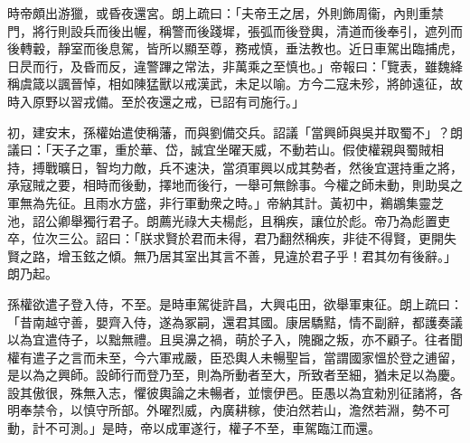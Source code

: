 \begin{pinyinscope}
時帝頗出游獵，或昏夜還宮。朗上疏曰：「夫帝王之居，外則飾周衞，內則重禁門，將行則設兵而後出幄，稱警而後踐墀，張弧而後登輿，清道而後奉引，遮列而後轉轂，靜室而後息駕，皆所以顯至尊，務戒慎，垂法教也。近日車駕出臨捕虎，日昃而行，及昏而反，違警蹕之常法，非萬乘之至慎也。」帝報曰：「覽表，雖魏絳稱虞箴以諷晉悼，相如陳猛獸以戒漢武，未足以喻。方今二寇未殄，將帥遠征，故時入原野以習戎備。至於夜還之戒，已詔有司施行。」




初，建安末，孫權始遣使稱藩，而與劉備交兵。詔議「當興師與吳并取蜀不」？朗議曰：「天子之軍，重於華、岱，誠宜坐曜天威，不動若山。假使權親與蜀賊相持，搏戰曠日，智均力敵，兵不速決，當須軍興以成其勢者，然後宜選持重之將，承寇賊之要，相時而後動，擇地而後行，一舉可無餘事。今權之師未動，則助吳之軍無為先征。且雨水方盛，非行軍動衆之時。」帝納其計。黃初中，鵜鶘集靈芝池，詔公卿舉獨行君子。朗薦光祿大夫楊彪，且稱疾，讓位於彪。帝乃為彪置吏卒，位次三公。詔曰：「朕求賢於君而未得，君乃翻然稱疾，非徒不得賢，更開失賢之路，增玉鉉之傾。無乃居其室出其言不善，見違於君子乎！君其勿有後辭。」朗乃起。


孫權欲遣子登入侍，不至。是時車駕徙許昌，大興屯田，欲舉軍東征。朗上疏曰：「昔南越守善，嬰齊入侍，遂為冢嗣，還君其國。康居驕黠，情不副辭，都護奏議以為宜遣侍子，以黜無禮。且吳濞之禍，萌於子入，隗嚻之叛，亦不顧子。往者聞權有遣子之言而未至，今六軍戒嚴，臣恐輿人未暢聖旨，當謂國家慍於登之逋留，是以為之興師。設師行而登乃至，則為所動者至大，所致者至細，猶未足以為慶。設其傲很，殊無入志，懼彼輿論之未暢者，並懷伊邑。臣愚以為宜勑別征諸將，各明奉禁令，以慎守所部。外曜烈威，內廣耕稼，使泊然若山，澹然若淵，勢不可動，計不可測。」是時，帝以成軍遂行，權子不至，車駕臨江而還。



\end{pinyinscope}
